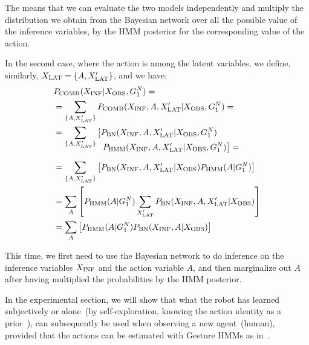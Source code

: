 The means that we can evaluate the two models independently and multiply the distribution we obtain from the Bayesian network over all the possible value of the inference variables, by the \ac{HMM} posterior for the corresponding value of the action.

In the second case, where the action is among the latent variables, we define, similarly, $X_\text{LAT} = \{A, X_\text{LAT}^\prime\}$, and we have:
\begin{align*}
  & \pcomb(\xinf| \xobs, G_1^N) = \\
  &= \sum_{\{A,\xlat^\prime\}} \pcomb(\xinf, A, \xlat^\prime| \xobs, G_1^N)=\\
  &= \sum_{\{A,\xlat^\prime\}} \left[\pbn(\xinf, A, \xlat^\prime| \xobs, G_1^N)\right. \\[-4mm]
    & \mspace{100mu} \left.\phmm(\xinf, A, \xlat^\prime| \xobs, G_1^N)\right]= \\[2mm]
  &= \sum_{\{A,\xlat^\prime\}} \left[\pbn(\xinf, A, \xlat^\prime| \xobs) \phmm(A | G_1^N)\right] \\
  &= \sum_{A}\left[\phmm(A | G_1^N)\sum_{\xlat^\prime} \pbn(\xinf, A, \xlat^\prime| \xobs)\right] \\
  &= \sum_{A}\left[\phmm(A | G_1^N) \pbn(\xinf, A| \xobs)\right] \\
\end{align*}

This time, we first need to use the Bayesian network to do inference on the inference variables $X_\text{INF}$ and the action variable $A$, and then marginalize out $A$ after having multiplied the probabilities by the HMM posterior.

%
%
%
%
In the experimental section, we will show that what the robot has learned subjectively or alone~(by self-exploration, knowing the action identity as a prior~\cite{salvi:2012:smcb}), can subsequently be used when observing a new agent~(human), provided that the actions can be estimated with Gesture \acp{HMM} as in~\cite{saponaro:2013:crhri}.
